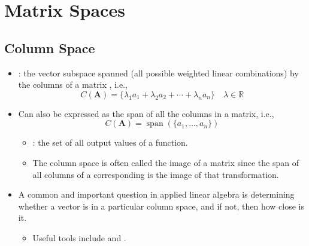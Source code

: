 \chapter{Matrix Spaces}\label{Matrix Spaces}
\section{Column Space}\label{Column Space}
\begin{itemize}
  \item {}: the vector subspace spanned (all possible weighted linear combinations) by the columns of a matrix , i.e.,
  \[%
  C(\bm{A})=\{\lambda_1a_1 + \lambda_2a_2 + \cdots + \lambda_n a_n\}\quad \lambda\in \mathbb{R}  
  \]%
  \item Can also be expressed as the span of all the columns in a matrix, i.e.,
  \[%
  C(\bm{A})= \operatorname{span}(\{a_1,\dots,a_n\})
  \]%
    \begin{itemize}
      \item {}: the set of all output values of a function. 
      \item The column space is often called the image of a matrix since the span of all columns of a corresponding \hyperref[tbd]{} is the image of that  transformation.
    \end{itemize}
  \item A common and important question in applied linear algebra is determining whether a vector is in a particular column space, and if not, then how close is it.
    \begin{itemize}
      \item Useful tools include \hyperref[Gaussian Elimination]{} and \hyperref[tbd]{}.
    \end{itemize}


\end{itemize}
